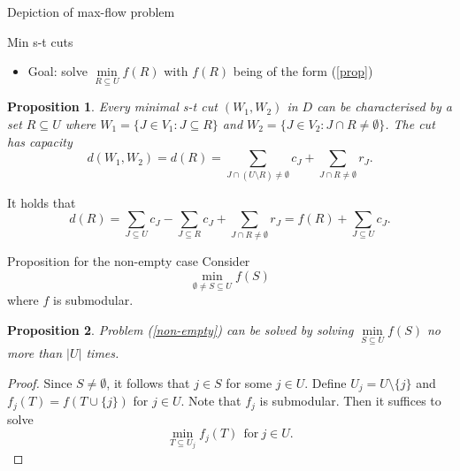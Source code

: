 \documentclass[usenames,dvipsnames]{beamer}
\newtheorem{prop}{Proposition}
\begin{document}
\begin{frame}{Depiction of max-flow problem}
  \begin{center}
    \end{center}
\end{frame}

\begin{frame}{Min s-t cuts}
  \begin{itemize}
    \item Goal: solve $\min\limits_{R \subseteq U} f(R)$ with $f(R)$ being of the form (\ref{prop})
  \end{itemize}
  \begin{prop}
    Every minimal s-t cut $(W_1, W_2)$ in $D$ can be characterised by
    a set $R \subseteq U$ where $W_1 = \{J \in V_1: J \subseteq R\}$
    and $W_2 = \{J \in V_2: J \cap R \neq \emptyset\}$. The cut has
    capacity \[d(W_1, W_2) = d(R) = \sum\limits_{J \cap (U \setminus
      R) \neq \emptyset} c_J + \sum\limits_{J \cap R \neq \emptyset}
    r_J.\]
  \end{prop}
It holds that  \[d(R) = \sum\limits_{J \subseteq U} c_J - \sum\limits_{J \subseteq R} c_J + \sum\limits_{J \cap R \neq \emptyset} r_J = f(R) + \sum\limits_{J \subseteq U} c_J.\]
\end{frame}

\begin{frame}{Proposition for the non-empty case}
  Consider \begin{equation}\min\limits_{\emptyset \neq S \subseteq U}
    f(S)\label{non-empty}\end{equation} where $f$ is submodular.
  \begin{prop}
    Problem (\ref{non-empty}) can be solved by solving $\min\limits_{S
      \subseteq U} f(S)$ no more than $|U|$ times.
  \end{prop}
  \begin{proof}
    Since $S \neq \emptyset$, it follows that $j \in S$ for some $j
    \in U$. Define $U_j = U \setminus \{j\}$ and $f_j(T) = f(T \cup
    \{j\})$ for $j \in U$. Note that $f_j$ is submodular. Then it
    suffices to solve \[\min\limits_{T \subseteq U_j}
    f_j(T)~~\text{for}~j \in U.\]
  \end{proof}
\end{frame}
\end{document}
